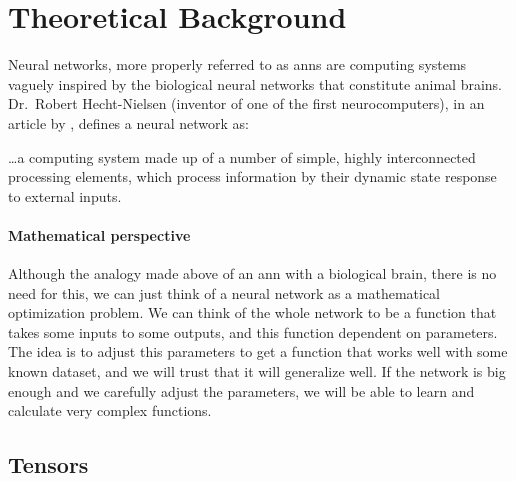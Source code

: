 

\chapter{Theoretical Background}\label{cha:theory}



\drop Neural networks, more properly referred to as
\glspl{ann} are computing systems vaguely inspired by the biological neural
networks that constitute animal brains. Dr.\ Robert Hecht-Nielsen (inventor of
one of the first neurocomputers), in an article by
, defines a neural network as:

\begin{quoteBox}
  \ldots a computing system made up of a number of simple, highly
  interconnected processing elements, which process information by their
  dynamic state response to external inputs.
  \tcblower{}
\end{quoteBox}

\subsubsection{Mathematical perspective}

Although the analogy made above of an \gls{ann} with a biological brain, there
is no need for this, we can just think of a neural network as a mathematical
optimization problem. We can think of the whole network to be a function that
takes some inputs to some outputs, and this function dependent on
parameters. The idea is to adjust this parameters to get a function that works
well with some known dataset, and we will trust that it will generalize
well. If the network is big enough and we carefully adjust the parameters, we
will be able to learn and calculate very complex functions.



\section{Tensors}


